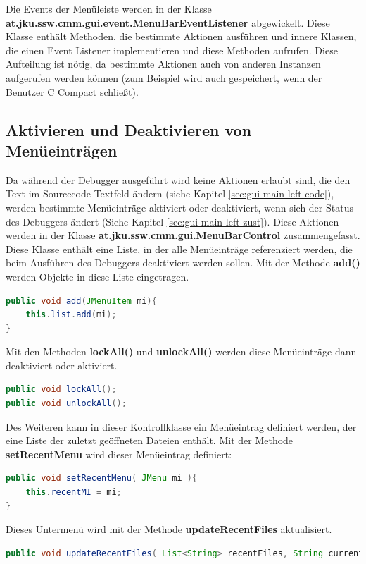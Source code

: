Die Events der Menüleiste werden in der Klasse \textbf{at.jku.ssw.cmm.gui.event.MenuBarEventListener} abgewickelt. Diese Klasse enthält Methoden, die bestimmte Aktionen ausführen und innere Klassen, die einen Event Listener implementieren und diese Methoden aufrufen. Diese Aufteilung ist nötig, da bestimmte Aktionen auch von anderen Instanzen aufgerufen werden können (zum Beispiel wird auch gespeichert, wenn der Benutzer C Compact schließt).

\subsection{Aktivieren und Deaktivieren von Menüeinträgen}
\label{sec:gui-main-menu-ctrl}
Da während der Debugger ausgeführt wird keine Aktionen erlaubt sind, die den Text im Sourcecode Textfeld ändern (siehe Kapitel \ref{sec:gui-main-left-code}), werden bestimmte Menüeinträge aktiviert oder deaktiviert, wenn sich der Status des Debuggers ändert (Siehe Kapitel \ref{sec:gui-main-left-zust}). Diese Aktionen werden in der Klasse \textbf{at.jku.ssw.cmm.gui.MenuBarControl} zusammengefasst. Diese Klasse enthält eine Liste, in der alle Menüeinträge referenziert werden, die beim Ausführen des Debuggers deaktiviert werden sollen. Mit der Methode \textbf{add()} werden Objekte in diese Liste eingetragen.
\begin{lstlisting}[language=JAVA]
public void add(JMenuItem mi){
	this.list.add(mi);
}
\end{lstlisting}

Mit den Methoden \textbf{lockAll()} und \textbf{unlockAll()} werden diese Menüeinträge dann deaktiviert oder aktiviert.

\begin{lstlisting}[language=JAVA]
public void lockAll();
public void unlockAll();
\end{lstlisting}

Des Weiteren kann in dieser Kontrollklasse ein Menüeintrag definiert werden, der eine Liste der zuletzt geöffneten Dateien enthält. Mit der Methode \textbf{setRecentMenu} wird dieser Menüeintrag definiert:
\begin{lstlisting}[language=JAVA]
public void setRecentMenu( JMenu mi ){
	this.recentMI = mi;
}
\end{lstlisting}

Dieses Untermenü wird mit der Methode \textbf{updateRecentFiles} aktualisiert.
\begin{lstlisting}[language=JAVA]
public void updateRecentFiles( List<String> recentFiles, String currentFile );
\end{lstlisting}


